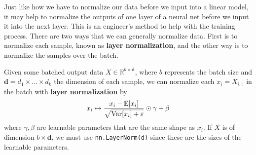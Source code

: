   Just like how we have to normalize our data before we input into a linear model, it may help to normalize the outputs of one layer of a neural net before we input it into the next layer. This is an engineer's method to help with the training process. There are two ways that we can generally normalize data. First is to normalize each sample, known as \textbf{layer normalization}, and the other way is to normalize the samples over the batch. 

  \begin{definition}
    \label{def:layer-norm}
    Given some batched output data $X \in \mathbb{R}^{b \times \mathbf{d}}$, where $b$ represents the batch size and $\mathbf{d} = d_1 \times \ldots \times d_k$ the dimension of each sample, we can normalize each $x_i = X_{i, :}$ in the batch with \textbf{layer normalization} by 
    \begin{equation}
      x_i \mapsto \frac{x_i - \mathbb{E}[x_i]}{\sqrt{\operatorname{Var}[x_i] + \varepsilon}} \odot \gamma + \beta
    \end{equation}
    where $\gamma, \beta$ are learnable parameters that are the same shape as $x_i$. If $X$ is of dimension $b \times \mathbf{d}$, we must use \texttt{nn.LayerNorm(d)} since these are the sizes of the learnable parameters. 
  \end{definition}

